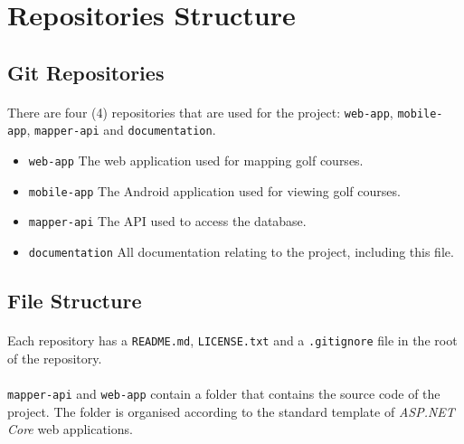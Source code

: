\documentclass{article}
\begin{document}
    \newpage

    \section{Repositories Structure}
    \label{sec:rs}

    \subsection{Git Repositories}
    \label{sec}

    \paragraph{}
    There are four (4) repositories that are used for the project:
    \texttt{web-app}, \texttt{mobile-app}, \texttt{mapper-api} and
    \texttt{documentation}.

    \begin{itemize}
        \item \texttt{web-app}
            \subitem The web application used for mapping golf courses.
        \item \texttt{mobile-app}
            \subitem The Android application used for viewing golf courses.
        \item \texttt{mapper-api}
            \subitem The API used to access the database.
        \item \texttt{documentation}
            \subitem All documentation relating to the project, including this
                    file.
    \end{itemize}

    \subsection{File Structure}

    \paragraph{}
    Each repository has a \texttt{README.md}, \texttt{LICENSE.txt} and a
    \texttt{.gitignore} file in the root of the repository.

    \paragraph{}
    \texttt{mapper-api} and \texttt{web-app} contain a folder that contains
    the source code of the project. The folder is organised according to the
    standard template of \textit{ASP.NET Core} web applications.
\end{document}
